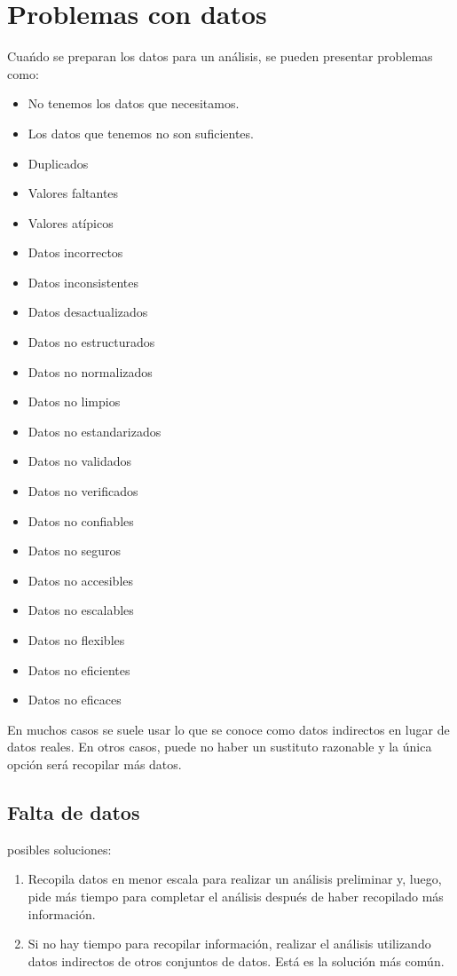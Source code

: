 \section{Problemas con datos}
Cua\'ndo se preparan los datos para un an\'alisis, se pueden presentar problemas como:
\begin{itemize}
    \item No tenemos los datos que necesitamos.
    \item Los datos que tenemos no son suficientes.
    \item Duplicados
    \item Valores faltantes
    \item Valores at\'ipicos
    \item Datos incorrectos
    \item Datos inconsistentes
    \item Datos desactualizados
    \item Datos no estructurados
    \item Datos no normalizados
    \item Datos no limpios
    \item Datos no estandarizados
    \item Datos no validados
    \item Datos no verificados
    \item Datos no confiables
    \item Datos no seguros
    \item Datos no accesibles
    \item Datos no escalables
    \item Datos no flexibles
    \item Datos no eficientes
    \item Datos no eficaces
\end{itemize}

En muchos casos se suele usar lo que se conoce como datos indirectos en lugar de datos reales. En otros casos, puede no haber un sustituto razonable y la \'unica opci\'on 
ser\'a recopilar m\'as datos.


\subsection{Falta de datos}

posibles soluciones: 

\begin{enumerate}
    \item Recopila datos en menor escala para realizar un an\'alisis preliminar y, luego, pide m\'as tiempo para completar el
     an\'alisis despu\'es de haber recopilado m\'as informaci\'on.
    \item Si no hay tiempo para recopilar informaci\'on, realizar el an\'alisis utilizando datos indirectos de otros conjuntos de datos. Est\'a es la soluci\'on m\'as com\'un.
    
\end{enumerate}


